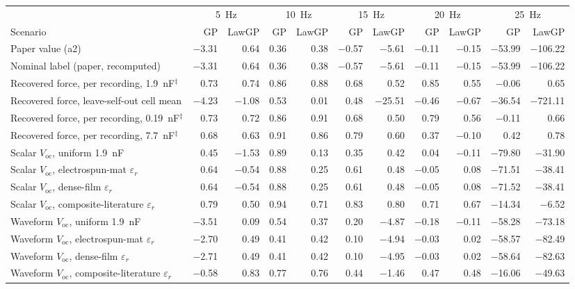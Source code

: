 \begin{tabular}{l rr rr rr rr rr}
\toprule
 & \multicolumn{2}{c}{\SI{5}{\hertz}} & \multicolumn{2}{c}{\SI{10}{\hertz}} & \multicolumn{2}{c}{\SI{15}{\hertz}} & \multicolumn{2}{c}{\SI{20}{\hertz}} & \multicolumn{2}{c}{\SI{25}{\hertz}} \\
\cmidrule(lr){2-3} \cmidrule(lr){4-5} \cmidrule(lr){6-7} \cmidrule(lr){8-9} \cmidrule(lr){10-11}
Scenario & GP & LawGP & GP & LawGP & GP & LawGP & GP & LawGP & GP & LawGP \\
\midrule
Paper value (a2) & $-$3.31 & 0.64 & 0.36 & 0.38 & $-$0.57 & $-$5.61 & $-$0.11 & $-$0.15 & $-$53.99 & $-$106.22 \\
Nominal label (paper, recomputed) & $-$3.31 & 0.64 & 0.36 & 0.38 & $-$0.57 & $-$5.61 & $-$0.11 & $-$0.15 & $-$53.99 & $-$106.22 \\
Recovered force, per recording, \SI{1.9}{\nano\farad}$^\ddagger$ & 0.73 & 0.74 & 0.86 & 0.88 & 0.68 & 0.52 & 0.85 & 0.55 & $-$0.06 & 0.65 \\
Recovered force, leave-self-out cell mean & $-$4.23 & $-$1.08 & 0.53 & 0.01 & 0.48 & $-$25.51 & $-$0.46 & $-$0.67 & $-$36.54 & $-$721.11 \\
Recovered force, per recording, \SI{0.19}{\nano\farad}$^\ddagger$ & 0.73 & 0.72 & 0.86 & 0.91 & 0.68 & 0.50 & 0.79 & 0.56 & $-$0.11 & 0.66 \\
Recovered force, per recording, \SI{7.7}{\nano\farad}$^\ddagger$ & 0.68 & 0.63 & 0.91 & 0.86 & 0.79 & 0.60 & 0.37 & $-$0.10 & 0.42 & 0.78 \\
Scalar $V_\mathrm{oc}$, uniform \SI{1.9}{\nano\farad} & 0.45 & $-$1.53 & 0.89 & 0.13 & 0.35 & 0.42 & 0.04 & $-$0.11 & $-$79.80 & $-$31.90 \\
Scalar $V_\mathrm{oc}$, electrospun-mat $\varepsilon_r$ & 0.64 & $-$0.54 & 0.88 & 0.25 & 0.61 & 0.48 & $-$0.05 & 0.08 & $-$71.51 & $-$38.41 \\
Scalar $V_\mathrm{oc}$, dense-film $\varepsilon_r$ & 0.64 & $-$0.54 & 0.88 & 0.25 & 0.61 & 0.48 & $-$0.05 & 0.08 & $-$71.52 & $-$38.41 \\
Scalar $V_\mathrm{oc}$, composite-literature $\varepsilon_r$ & 0.79 & 0.50 & 0.94 & 0.71 & 0.83 & 0.80 & 0.71 & 0.67 & $-$14.34 & $-$6.52 \\
Waveform $V_\mathrm{oc}$, uniform \SI{1.9}{\nano\farad} & $-$3.51 & 0.09 & 0.54 & 0.37 & 0.20 & $-$4.87 & $-$0.18 & $-$0.11 & $-$58.28 & $-$73.18 \\
Waveform $V_\mathrm{oc}$, electrospun-mat $\varepsilon_r$ & $-$2.70 & 0.49 & 0.41 & 0.42 & 0.10 & $-$4.94 & $-$0.03 & 0.02 & $-$58.57 & $-$82.49 \\
Waveform $V_\mathrm{oc}$, dense-film $\varepsilon_r$ & $-$2.71 & 0.49 & 0.41 & 0.42 & 0.10 & $-$4.95 & $-$0.03 & 0.02 & $-$58.64 & $-$82.63 \\
Waveform $V_\mathrm{oc}$, composite-literature $\varepsilon_r$ & $-$0.58 & 0.83 & 0.77 & 0.76 & 0.44 & $-$1.46 & 0.47 & 0.48 & $-$16.06 & $-$49.63 \\
\bottomrule
\end{tabular}
